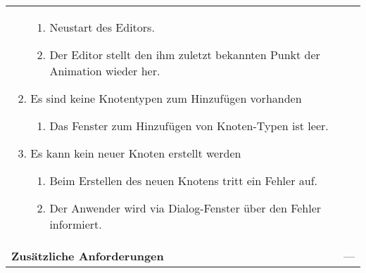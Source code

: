 \begin{longtabu}{p{0.5\textwidth}p{0.5\textwidth}}
\begin{enumerate}[label= (\alph*)]
{\begin{enumerate}[label= (\roman*)]
                        \item{Neustart des Editors.}
                        \item{Der Editor stellt den ihm zuletzt bekannten
                                Punkt der Animation wieder her.}
                \end{enumerate}
            }
            \item{Es sind keine Knotentypen zum Hinzufügen vorhanden
                \begin{enumerate}[label= (\roman*)]
                    \item{Das Fenster zum Hinzufügen von Knoten-Typen ist leer.}
                \end{enumerate}
            }
            \item{Es kann kein neuer Knoten erstellt werden
                \begin{enumerate}[label= (\roman*)]
                    \item{Beim Erstellen des neuen Knotens tritt ein Fehler auf.}
                    \item{Der Anwender wird via Dialog-Fenster über den Fehler
                            informiert.}
                \end{enumerate}
            }
        \end{enumerate}
        \\
    \cmidrule(r){1-1}\cmidrule(lr){2-2}
        \textbf{Zusätzliche Anforderungen} &
        --- \\
    \bottomrule
\end{longtabu}
